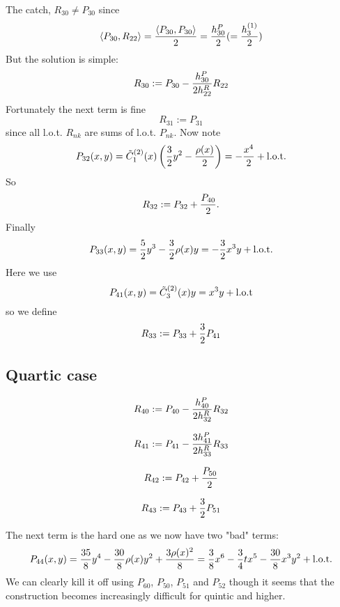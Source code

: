 \documentclass[12pt,a4paper]{article}
\begin{document}
The catch, $R_{30} \neq P_{30}$ since 
$$
\ip<P_{30},R_{22}> = {\ip<P_{30}, P_{30}> \over 2} = {h_{30}^P \over 2}  (= {h_3^{(1)} \over 2})
$$
But the solution is simple:
$$
R_{30} := P_{30} - {h_{30}^P \over 2 h_{22}^R} R_{22}
$$
Fortunately the next term is fine
$$
R_{31} := P_{31}
$$
since all l.o.t. $R_{nk}$ are sums of l.o.t. $P_{nk}$. Now note
$$
P_{32}(x,y) = \C_1^{(2)}(x) \pr( {3 \over 2} y^2 - {\rho(x) \over 2} ) = -{x^4 \over 2} + {\rm l.o.t.}
$$
So
$$
R_{32} := P_{32} + {P_{40} \over 2}.
$$
Finally
$$
P_{33}(x,y) = {5 \over 2} y^3 - {3 \over 2} \rho(x) y = - {3 \over 2} x^3 y + {\rm l.o.t.}
$$
Here we use
$$
P_{41}(x,y) = \tilde C_3^{(2)}(x) y = x^3 y + {\rm l.o.t}
$$
so we define
$$
R_{33} := P_{33} + {3 \over 2} P_{41}
$$

\subsection{Quartic case}

$$
R_{40} := P_{40} - {h_{40}^P \over 2 h_{32}^R} R_{32}
$$

$$
R_{41} := P_{41} - {3 h_{41}^P \over 2 h_{33}^R} R_{33}
$$

$$
R_{42} := P_{42} + {P_{50} \over 2}
$$

$$
R_{43} := P_{43} + {3 \over 2} P_{51}
$$

The next term is the hard one as we now have two "bad" terms:
$$
P_{44}(x,y)  = {35 \over 8} y^4 - {30 \over 8} \rho(x) y^2 + {3 \rho(x)^2 \over 8} = {3 \over 8} x^6 - {3 \over 4} t x^5 - {30 \over 8} x^3 y^2 + {\rm l.o.t.}
$$
We can clearly kill it off using $P_{60}$, $P_{50}$, $P_{51}$ and $P_{52}$ though it seems that the construction becomes increasingly difficult for quintic and higher.
\end{document}
